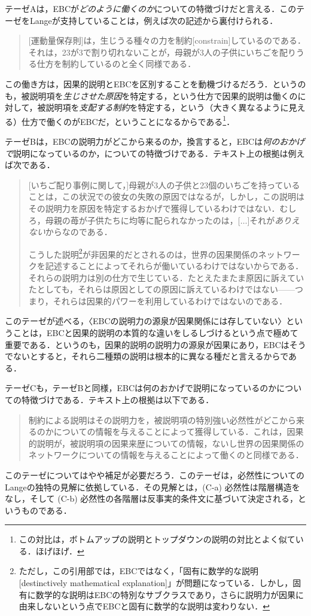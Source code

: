 \documentclass[dvipdfmx,twoside,11pt,uplatex]{jsarticle}
\theoremstyle{definition}
\begin{document}
テーゼAは，EBCが\emph{どのように働くのか}についての特徴づけだと言える．このテーゼをLangeが支持していることは，例えば次の記述から裏付けられる．
\begin{quote}
    [運動量保存則]は，生じうる種々の力を制約[constrain]しているのである．それは，23が3で割り切れないことが，母親が3人の子供にいちごを配りうる仕方を制約しているのと全く同様である．\citep[17]{Lange2018bwcsum}
\end{quote}
この働き方は，因果的説明とEBCを区別することを動機づけるだろう．というのも，被説明項を\emph{生じさせた原因}を特定する，という仕方で因果的説明は働くのに対して，被説明項を\emph{支配する制約}を特定する，という（大きく異なるように見える）仕方で働くのがEBCだ，ということになるからである\footnote{
この対比は，ボトムアップの説明とトップダウンの説明の対比とよく似ている\citep{kitcher1985two}．ほげほげ．
}．

テーゼBは，EBCの説明力がどこから来るのか，換言すると，EBCは\emph{何のおかげで}説明になっているのか，についての特徴づけである．テキスト上の根拠は例えば次である．
\begin{quote}
    [いちご配り事例に関して，]母親が3人の子供と23個のいちごを持っていることは，この状況での彼女の失敗の原因ではなるが，しかし，この説明はその説明力を原因を特定するおかげで獲得しているわけではない．むしろ，母親の苺が子供たちに均等に配られなかったのは，[$\ldots$]それが\emph{ありえない}からなのである．\citep[15]{Lange2018bwcsum}\vspace{7pt}

    こうした説明\footnote{
    ただし，この引用部では，EBCではなく，「固有に数学的な説明[destinctively mathematical explanation]」が問題になっている．しかし，固有に数学的な説明はEBCの特別なサブクラスであり，さらに説明力が因果に由来しないという点でEBCと固有に数学的な説明は変わりない．
    }が非因果的だとされるのは，世界の因果関係のネットワークを記述することによってそれらが働いているわけではないからである．それらの説明力は別の仕方で生じている．たとえたまたま原因に訴えていたとしても，それらは原因としての原因に訴えているわけではない------つまり，それらは因果的パワーを利用しているわけではないのである．\citep[496]{lange2013dme}
\end{quote}
このテーゼが述べる，〈EBCの説明力の源泉が因果関係には存していない〉ということは，EBCと因果的説明の本質的な違いをしるしづけるという点で極めて重要である．というのも，因果的説明の説明力の源泉が因果にあり，EBCはそうでないとすると，それら二種類の説明は根本的に異なる種だと言えるからである．

テーゼCも，テーゼBと同様，EBCは何のおかげで説明になっているのかについての特徴づけである．テキスト上の根拠は以下である．
\begin{quote}
    制約による説明はその説明力を，被説明項の特別強い必然性がどこから来るのかについての情報を与えることによって獲得している．これは，因果的説明が，被説明項の因果来歴についての情報，ないし世界の因果関係のネットワークについての情報を与えることによって働くのと同様である．\citep[24]{Lange2018bwcsum}
\end{quote}
このテーゼについてはやや補足が必要だろう．このテーゼは，必然性についてのLangeの独特の見解に依拠している\citep{lange2009lawmakers}．その見解とは，(C-a) 必然性は階層構造をなし，そして (C-b) 必然性の各階層は反事実的条件文に基づいて決定される，というものである．
\end{document}
